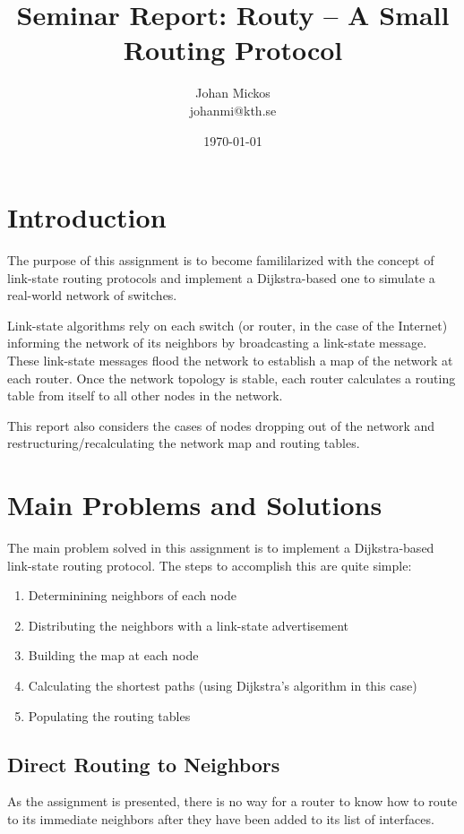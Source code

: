 \documentclass[a4paper, 10pt]{article}
\title{Seminar Report: Routy -- A Small Routing Protocol}
\author{Johan Mickos \\ johanmi@kth.se}
\date{\today{}}
\begin{document}
\maketitle
\newpage

\section{Introduction}
The purpose of this assignment is to become famililarized with the concept of link-state routing protocols and implement a Dijkstra-based one to simulate a real-world network of switches.

Link-state algorithms rely on each switch (or router, in the case of the Internet) informing the network of its neighbors by broadcasting a link-state message. These link-state messages flood the network to establish a map of the network at each router. Once the network topology is stable, each router calculates a routing table from itself to all other nodes in the network.

This report also considers the cases of nodes dropping out of the network and restructuring/recalculating the network map and routing tables.

\section{Main Problems and Solutions}
The main problem solved in this assignment is to implement a Dijkstra-based link-state routing protocol. The steps to accomplish this are quite simple:

\begin{enumerate}
    \item Determinining neighbors of each node
    \item Distributing the neighbors with a link-state advertisement
    \item Building the map at each node
    \item Calculating the shortest paths (using Dijkstra's algorithm in this case)
    \item Populating the routing tables
\end{enumerate}

\subsection{Direct Routing to Neighbors}
As the assignment is presented, there is no way for a router to know how to route to its immediate neighbors after they have been added to its list of interfaces.
\end{document}
